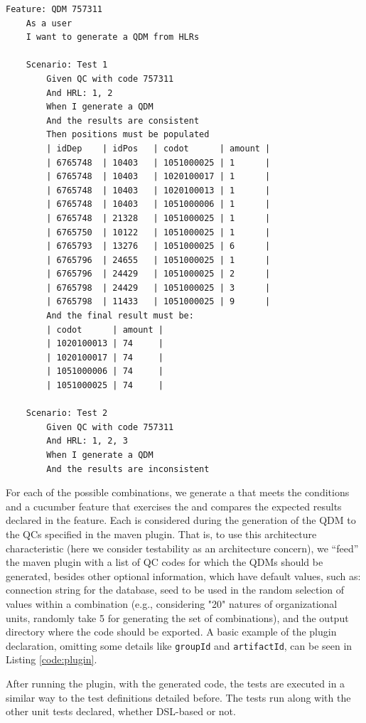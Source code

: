 \begin{lstlisting}[frame=single, language=Cucumber, caption={\it Cucumber feature}, label={code:cucumber},basicstyle=\scriptsize]
Feature: QDM 757311
	As a user
	I want to generate a QDM from HLRs

	Scenario: Test 1
		Given QC with code 757311
		And HRL: 1, 2
		When I generate a QDM
		And the results are consistent
		Then positions must be populated
		| idDep    | idPos   | codot      | amount |
		| 6765748  | 10403   | 1051000025 | 1      |
		| 6765748  | 10403   | 1020100017 | 1      |
		| 6765748  | 10403   | 1020100013 | 1      |
		| 6765748  | 10403   | 1051000006 | 1      |
		| 6765748  | 21328   | 1051000025 | 1      |
		| 6765750  | 10122   | 1051000025 | 1      |    
		| 6765793  | 13276   | 1051000025 | 6      |
		| 6765796  | 24655   | 1051000025 | 1      |
		| 6765796  | 24429   | 1051000025 | 2      |
		| 6765798  | 24429   | 1051000025 | 3      |
		| 6765798  | 11433   | 1051000025 | 9      |   
		And the final result must be:
		| codot      | amount |
		| 1020100013 | 74     |
		| 1020100017 | 74     |
		| 1051000006 | 74     |
		| 1051000025 | 74     |

	Scenario: Test 2
		Given QC with code 757311
		And HRL: 1, 2, 3
		When I generate a QDM
		And the results are inconsistent    
\end{lstlisting}

For each of the possible combinations, we generate a \shc that meets the conditions 
and a cucumber feature that exercises the \shc and compares the expected results declared in the feature. 
Each \shc is considered during the generation of the QDM to the QCs specified in the 
maven plugin. That is, to use this architecture characteristic (here we consider testability as an 
architecture concern), we ``feed'' the maven plugin with a list of QC codes for which the QDMs should be generated, 
besides other optional information, which have default values, such as: connection string for the database, 
seed to be used in the random selection of values within a combination (e.g., considering "20" natures of 
organizational units, randomly take 5 for generating the set of combinations), and the output directory 
where the code should be exported. A basic example of the plugin declaration, omitting some details like 
\texttt{groupId} and \texttt{artifactId}, can be seen in Listing \ref{code:plugin}.

After running the plugin, with the generated code, the tests are executed in a similar way to the test 
definitions detailed before. The tests run along with the other unit tests declared, 
whether DSL-based or not.
